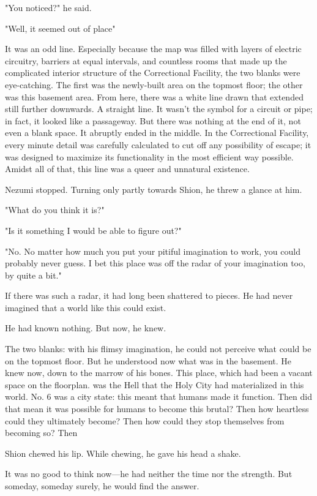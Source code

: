 "You noticed?" he said.

"Well, it seemed out of place\el "

It was an odd line. Especially because the map was filled with layers of
electric circuitry, barriers at equal intervals, and countless rooms
that made up the complicated interior structure of the Correctional
Facility, the two blanks were eye-catching. The first was the
newly-built area on the topmost floor; the other was this basement area.
From here, there was a white line drawn that extended still further
downwards. A straight line. It wasn't the symbol for a circuit or pipe;
in fact, it looked like a passageway. But there was nothing at the end
of it, not even a blank space. It abruptly ended in the middle. In the
Correctional Facility, every minute detail was carefully calculated to
cut off any possibility of escape; it was designed to maximize its
functionality in the most efficient way possible. Amidst all of that,
this line was a queer and unnatural existence.

Nezumi stopped. Turning only partly towards Shion, he threw a glance at
him.

"What do you think it is?"

"Is it something I would be able to figure out?"

"No. No matter how much you put your pitiful imagination to work, you
could probably never guess. I bet this place was off the radar of your
imagination too, by quite a bit."

If there was such a radar, it had long been shattered to pieces. He had
never imagined that a world like this could exist.

He had known nothing. But now, he knew.

The two blanks: with his flimsy imagination, he could not perceive what
could be on the topmost floor. But he understood now what was in the
basement. He knew now, down to the marrow of his bones. This place,
which had been a vacant space on the floorplan. was the Hell that the
Holy City had materialized in this world. No. 6 was a city state: this
meant that humans made it function. Then did that mean it was possible
for humans to become this brutal? Then how heartless could they
ultimately become? Then how could they stop themselves from becoming so?
Then\el 

Shion chewed his lip. While chewing, he gave his head a shake.

It was no good to think now---he had neither the time nor the strength.
But someday, someday surely, he would find the answer.

